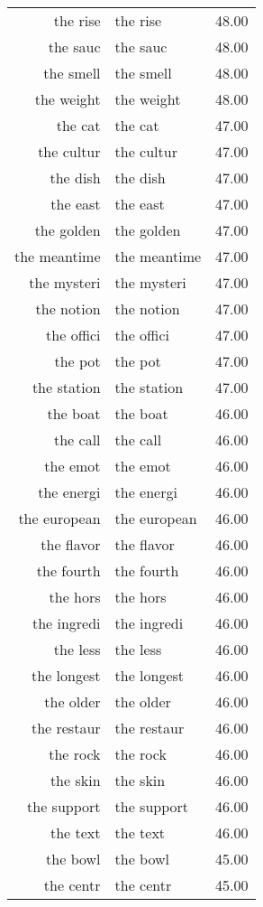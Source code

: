 \begin{table}[ht]
\begin{tabular}{rlr}
  the rise & the rise & 48.00 \\ 
  the sauc & the sauc & 48.00 \\ 
  the smell & the smell & 48.00 \\ 
  the weight & the weight & 48.00 \\ 
  the cat & the cat & 47.00 \\ 
  the cultur & the cultur & 47.00 \\ 
  the dish & the dish & 47.00 \\ 
  the east & the east & 47.00 \\ 
  the golden & the golden & 47.00 \\ 
  the meantime & the meantime & 47.00 \\ 
  the mysteri & the mysteri & 47.00 \\ 
  the notion & the notion & 47.00 \\ 
  the offici & the offici & 47.00 \\ 
  the pot & the pot & 47.00 \\ 
  the station & the station & 47.00 \\ 
  the boat & the boat & 46.00 \\ 
  the call & the call & 46.00 \\ 
  the emot & the emot & 46.00 \\ 
  the energi & the energi & 46.00 \\ 
  the european & the european & 46.00 \\ 
  the flavor & the flavor & 46.00 \\ 
  the fourth & the fourth & 46.00 \\ 
  the hors & the hors & 46.00 \\ 
  the ingredi & the ingredi & 46.00 \\ 
  the less & the less & 46.00 \\ 
  the longest & the longest & 46.00 \\ 
  the older & the older & 46.00 \\ 
  the restaur & the restaur & 46.00 \\ 
  the rock & the rock & 46.00 \\ 
  the skin & the skin & 46.00 \\ 
  the support & the support & 46.00 \\ 
  the text & the text & 46.00 \\ 
  the bowl & the bowl & 45.00 \\ 
  the centr & the centr & 45.00 \\ 

\end{tabular}
\end{table}
